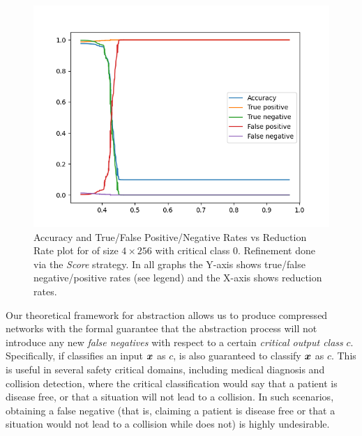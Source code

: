 \begin{figure}
    \vspace*{-1cm}
    \includegraphics[scale=0.4]{figs/mnist-compr-4-256-samples.png}
    \caption{Accuracy and True/False Positive/Negative Rates vs Reduction Rate
        plot for \mnist of size $4 \times 256$ with critical class 0. Refinement
    done via the \emph{Score} strategy. In all graphs the Y-axis shows
    true/false negative/positive rates (see legend) and the X-axis shows
    reduction rates.   }
    \label{f:mnist-class}
    \vspace*{-1cm}
\end{figure}

Our theoretical framework for abstraction allows us to produce compressed
networks with the formal guarantee that the abstraction process will not
introduce any new \emph{false negatives} with respect to a certain
\emph{critical output class} $c$. Specifically, if \cnc classifies an input
$\boldsymbol{x}$ as $c$, \abs is also guaranteed to classify $\boldsymbol{x}$ as $c$. This is
useful in several safety critical domains, including medical diagnosis and
collision detection, where the critical classification would say that a patient
is disease free, or that a situation will not lead to a collision. In such
scenarios, obtaining a false negative (that is, \abs claiming a
patient is disease free or that a situation would not lead to a collision while
\cnc does not) is highly undesirable. 

